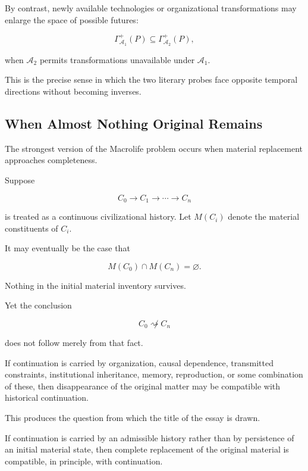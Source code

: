 \documentclass[
  11pt,
  a4paper,
  DIV=12,
  BCOR=0mm,
  parskip=half-
]{scrartcl}
\newcommand{\Adm}{\mathcal A}
\theoremstyle{definition}
\theoremstyle{plain}
\theoremstyle{remark}
\begin{document}
By contrast, newly available technologies or organizational transformations
may enlarge the space of possible futures:

\[
  \Gamma^{+}_{\Adm_1}(P)
  \subseteq
  \Gamma^{+}_{\Adm_2}(P),
\]

when \(\Adm_2\) permits transformations unavailable under \(\Adm_1\).

This is the precise sense in which the two literary probes face opposite
temporal directions without becoming inverses.


\subsection{When Almost Nothing Original Remains}
\label{sec:macrolife-limit}

The strongest version of the Macrolife problem occurs when material
replacement approaches completeness.

Suppose

\[
  C_0
  \longrightarrow
  C_1
  \longrightarrow
  \cdots
  \longrightarrow
  C_n
\]

is treated as a continuous civilizational history. Let \(M(C_i)\) denote the
material constituents of \(C_i\).

It may eventually be the case that

\[
  M(C_0)\cap M(C_n)=\varnothing.
\]

Nothing in the initial material inventory survives.

Yet the conclusion

\[
  C_0\not\rightsquigarrow C_n
\]

does not follow merely from that fact.

If continuation is carried by organization, causal dependence, transmitted
constraints, institutional inheritance, memory, reproduction, or some
combination of these, then disappearance of the original matter may be
compatible with historical continuation.

This produces the question from which the title of the essay is drawn.

\begin{held}
\centering
If continuation is carried by an admissible history rather than by
persistence of an initial material state, then complete replacement of the
original material is compatible, in principle, with continuation.
\end{held}
\end{document}
